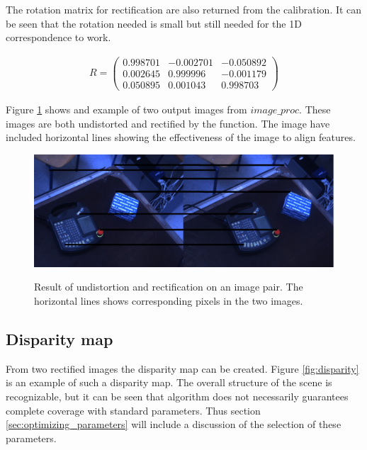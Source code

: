 The rotation matrix for rectification are also returned from the calibration. It can be seen that the rotation needed is small but still needed for the 1D correspondence to work. 

\begin{equation}\label{eq:distortion}
\begin{split}
R =
 \begin{pmatrix}
  0.998701 & -0.002701 & -0.050892 \\
  0.002645 & 0.999996 & -0.001179 \\
  0.050895 & 0.001043 & 0.998703 
 \end{pmatrix}
\end{split}
\end{equation}

Figure \ref{fig:rectified} shows and example of two output images from $image\_proc$. These images are both undistorted and rectified by the function. The image have included horizontal lines showing the effectiveness of the image to align features.

\begin{figure}[h!]
  \caption{Result of undistortion and rectification on an image pair. The horizontal lines shows corresponding pixels in the two images.}
  \centering
    \includegraphics[width=\textwidth]{graphics/06_vision/rectified.jpg}
    \label{fig:rectified}
\end{figure}

\subsection{Disparity map}

From two rectified images the disparity map can be created. Figure \ref{fig:disparity} is an example of such a disparity map. The overall structure of the scene is recognizable, but it can be seen that algorithm does not necessarily guarantees complete coverage with standard parameters. Thus section \ref{sec:optimizing_parameters} will include a discussion of the selection of these parameters.

